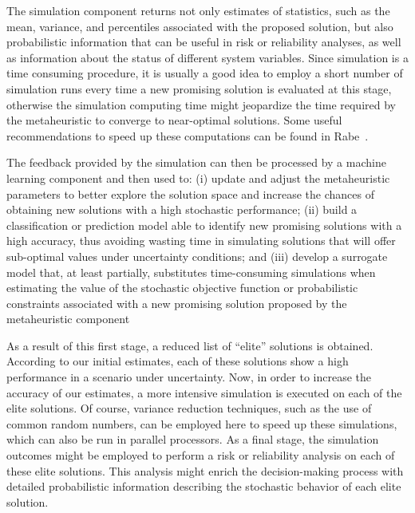 The simulation component returns not only estimates of statistics, such as the
mean, variance, and percentiles associated with the proposed solution, but also
probabilistic information that can be useful in risk or reliability analyses, as
well as information about the status of different system variables. Since
simulation is a time consuming procedure, it is usually a good idea to employ a
short number of simulation runs every time a new promising solution is evaluated
at this stage, otherwise the simulation computing time might jeopardize the time
required by the metaheuristic to converge to near-optimal solutions.  Some
useful recommendations to speed up these computations can be found in
Rabe~\cite{rabe:2020}.

The feedback provided by the simulation can then be processed by a machine
learning component and then used to: (i) update and adjust the metaheuristic
parameters to better explore the solution space and increase the chances of
obtaining new solutions with a high stochastic performance; (ii) build a
classification or prediction model able to identify new promising solutions with
a high accuracy, thus avoiding wasting time in simulating solutions that will
offer sub-optimal values under uncertainty conditions; and (iii) develop a
surrogate model that, at least partially, substitutes time-consuming simulations
when estimating the value of the stochastic objective function or probabilistic
constraints associated with a new promising solution proposed by the
metaheuristic component

As a result of this first stage, a reduced list of ``elite'' solutions is
obtained. According to our initial estimates, each of these solutions show a
high performance in a scenario under uncertainty. Now, in order to increase the
accuracy of our estimates, a more intensive simulation is executed on each of
the elite solutions. Of course, variance reduction techniques, such as the use
of common random numbers, can be employed here to speed up these simulations,
which can also be run in parallel processors. As a final stage, the simulation
outcomes might be employed to perform a risk or reliability analysis on each of
these elite solutions. This analysis might enrich the decision-making process
with detailed probabilistic information describing the stochastic behavior of
each elite solution.


